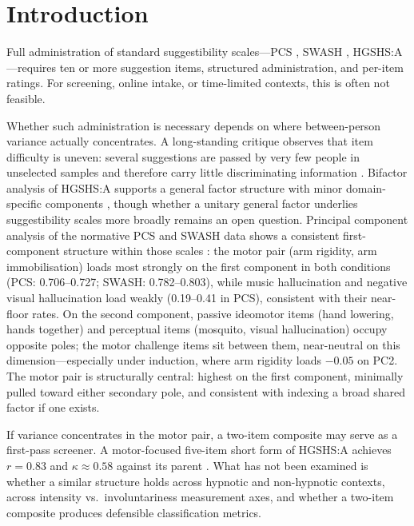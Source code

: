 \documentclass[12pt,a4paper]{article}
\begin{document}
\clearpage

\section{Introduction}

Full administration of standard suggestibility scales---PCS \citep{lush2021pcs},
SWASH \citep{lush2018swash}, HGSHS:A \citep{shor1962hgshs}---requires
ten or more suggestion items, structured administration, and per-item
ratings. For screening, online intake, or time-limited contexts, this is
often not feasible.

Whether such administration is necessary depends on where between-person
variance actually concentrates. A long-standing critique observes that item
difficulty is uneven: several suggestions are passed by very few people
in unselected samples and therefore carry little discriminating information
\citep{coe1971difficulty, sadler2004irt}. Bifactor analysis of HGSHS:A supports a general factor structure with
minor domain-specific components \citep{zahedi2022bifactor}, though whether
a unitary general factor underlies suggestibility scales more broadly remains
an open question. Principal component analysis of the normative PCS and SWASH
data shows a consistent first-component structure within those scales
\citep[supplementary materials]{lush2021pcs}: the motor pair (arm rigidity,
arm immobilisation) loads most strongly on the first component in both
conditions (PCS: 0.706--0.727; SWASH: 0.782--0.803), while music
hallucination and negative visual hallucination load weakly (0.19--0.41
in PCS), consistent with their near-floor rates. On the second component,
passive ideomotor items (hand lowering, hands together) and perceptual
items (mosquito, visual hallucination) occupy opposite poles; the motor
challenge items sit between them, near-neutral on this dimension---especially
under induction, where arm rigidity loads $-0.05$ on PC2. The motor pair is
structurally central: highest on the first component, minimally pulled toward
either secondary pole, and consistent with indexing a broad shared factor
if one exists.

If variance concentrates in the motor pair, a two-item composite may
serve as a first-pass screener. A motor-focused five-item short form of
HGSHS:A achieves $r = 0.83$ and $\kappa \approx 0.58$ against its parent
\citep{riegel2021hgshs5g, zech2024hgshs5g}. What has not been examined
is whether a similar structure holds across hypnotic and non-hypnotic
contexts, across intensity vs.\ involuntariness measurement axes, and whether
a two-item composite produces defensible classification metrics.
\end{document}
